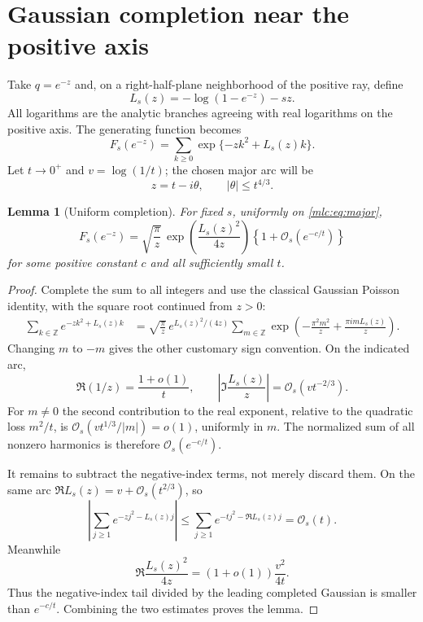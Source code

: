 \documentclass[11pt]{article}
\newtheorem{lemma}[theorem]{Lemma}
\theoremstyle{remark}\newtheorem{remark}[theorem]{Remark}
\newcommand{\OO}{\mathcal O}
\begin{document}
\section{Gaussian completion near the positive axis}\label{mlc:sec:poisson}
Take $q=e^{-z}$ and, on a right-half-plane neighborhood of the positive ray, define
\begin{equation}\label{mlc:eq:L}
 L_s(z)=-\log(1-e^{-z})-sz.
\end{equation}
All logarithms are the analytic branches agreeing with real logarithms on the positive axis. The generating function becomes
\begin{equation}\label{mlc:eq:gaussiansum}
 F_s(e^{-z})=\sum_{k\ge0}\exp\{-zk^2+L_s(z)k\}.
\end{equation}
Let $t\to0^+$ and $v=\log(1/t)$; the chosen major arc will be
\begin{equation}\label{mlc:eq:major}
 z=t-i\theta,\qquad |\theta|\le t^{4/3}.
\end{equation}

\begin{lemma}[Uniform completion]\label{mlc:lem:completion}
For fixed $s$, uniformly on \eqref{mlc:eq:major},
\begin{equation}\label{mlc:eq:completion}
 F_s(e^{-z})=\sqrt{\frac\pi z}\,
       \exp\!\left(\frac{L_s(z)^2}{4z}\right)
       \left\{1+\OO_s(e^{-c/t})\right\}
\end{equation}
for some positive constant $c$ and all sufficiently small $t$.
\end{lemma}
\begin{proof}
Complete the sum to all integers and use the classical Gaussian Poisson identity, with the square root continued from $z>0$:
\begin{align}
 \sum_{k\in\mathbb Z}e^{-zk^2+L_s(z)k}
  &=\sqrt{\frac\pi z}\,e^{L_s(z)^2/(4z)}
    \sum_{m\in\mathbb Z}
       \exp\!\left(-\frac{\pi^2m^2}z+\frac{\pi i mL_s(z)}z\right).
 \label{mlc:eq:poisson}
\end{align}
Changing $m$ to $-m$ gives the other customary sign convention. On the indicated arc,
\begin{equation}\label{mlc:eq:harmonicbounds}
 \Re(1/z)=\frac{1+o(1)}t,\qquad
 \left|\Im\frac{L_s(z)}z\right|=\OO_s(vt^{-2/3}).
\end{equation}
For $m\ne0$ the second contribution to the real exponent, relative to the quadratic loss $m^2/t$, is $\OO_s(vt^{1/3}/|m|)=o(1)$, uniformly in $m$. The normalized sum of all nonzero harmonics is therefore $\OO_s(e^{-c/t})$.

It remains to subtract the negative-index terms, not merely discard them. On the same arc $\Re L_s(z)=v+\OO_s(t^{2/3})$, so
\begin{equation}\label{mlc:eq:negative}
 \left|\sum_{j\ge1}e^{-zj^2-L_s(z)j}\right|
 \le\sum_{j\ge1}e^{-tj^2-\Re L_s(z)j}=\OO_s(t).
\end{equation}
Meanwhile
\[
 \Re\frac{L_s(z)^2}{4z}=(1+o(1))\frac{v^2}{4t}.
\]
Thus the negative-index tail divided by the leading completed Gaussian is smaller than $e^{-c/t}$. Combining the two estimates proves the lemma.
\end{proof}
\end{document}
